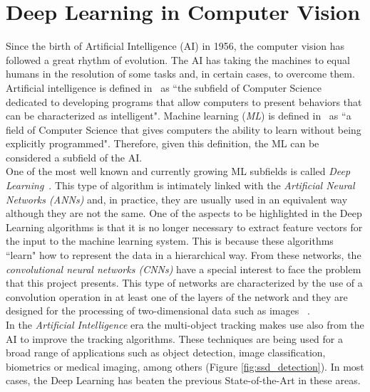 \section{Deep Learning in Computer Vision}
Since the birth of Artificial Intelligence (AI) in 1956, the computer vision has followed a great rhythm of evolution. The AI has taking the machines to equal humans in the resolution of some tasks and, in certain cases, to overcome them.
Artificial intelligence is defined in~\cite{mccarthy2006proposal} as ``the subfield of Computer Science dedicated to developing programs that allow computers to present behaviors that can be characterized as intelligent". Machine learning (\textit{ML}) is defined in~\cite{samuel2000some} as ``a field of Computer Science that gives computers the ability to learn without being explicitly programmed". Therefore, given this definition, the ML can be considered a subfield of the AI.\\
One of the most well known and currently growing ML subfields is called \textit{Deep Learning}~\cite{deng2014deep}. This type of algorithm is intimately linked with the \textit{Artificial Neural Networks (ANNs)} and, in practice, they are usually used in an equivalent way although they are not the same. One of the aspects to be highlighted in the Deep Learning algorithms is that it is no longer necessary to extract feature vectors for the input to the machine learning system. This is because these algorithms ``learn" how to represent the data in a hierarchical way. From these networks, the \textit{convolutional neural networks (CNNs)} have a special interest to face the problem that this project presents. This type of networks are characterized by the use of a convolution operation in at least one of the layers of the network and they are designed for the processing of two-dimensional data such as images ~\cite{liu2015implementation}.\\
In the \textit{Artificial Intelligence} era the multi-object tracking makes use also from the AI to improve the tracking algorithms. These techniques are being used for a broad range of applications such as object detection, image classification, biometrics or medical imaging, among others (Figure \ref{fig:ssd_detection}). In most cases, the Deep Learning has beaten the previous State-of-the-Art in these areas.
